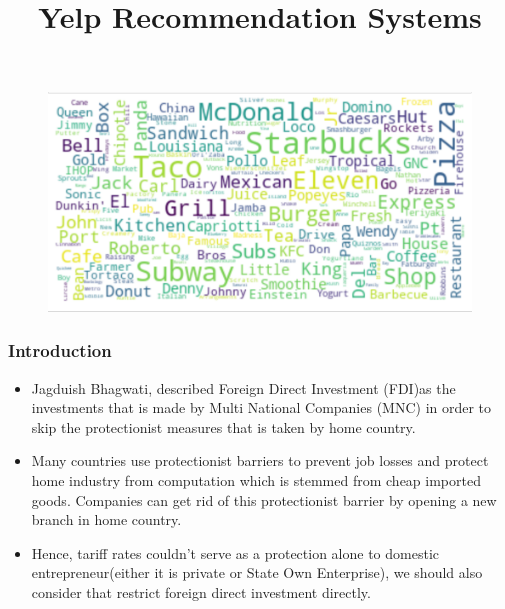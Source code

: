 \documentclass[xcolor=dvipsnames]{beamer}
\title [Nashville Software School] {Yelp Recommendation Systems}
\author[Bernes Karachai]{}
\institute[]{}
\date{}
\begin{document}
\begin{frame}
\titlepage
\vspace{-3cm}
\begin{figure}
		\includegraphics[scale=0.6]{world_cloud_res1.png}
\end{figure}
\end{frame}

\begin{frame}
\frametitle{Introduction}
\begin{itemize}
  \item Jagduish Bhagwati, described Foreign Direct Investment (FDI)as the investments that is made
  by Multi National Companies (MNC) in order to skip the protectionist measures that is taken by
  home country.
 \item Many countries use protectionist barriers to prevent job losses and protect home
 industry from computation which is stemmed from cheap imported goods. Companies can get
 rid of this protectionist barrier by opening a new branch in home country.
 \item Hence, tariff rates
 couldn't serve as a protection alone to domestic entrepreneur(either it is private or State Own
 Enterprise), we should also consider that restrict foreign direct investment directly.
\end{itemize}
\end{frame}
\end{document}
